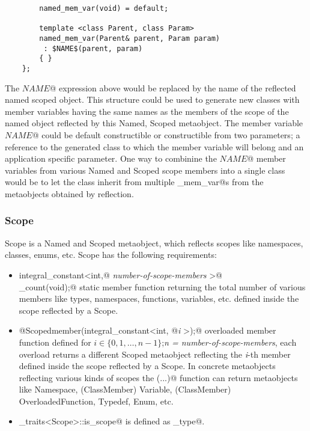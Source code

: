 \begin{itemize}
\begin{lstlisting}
		named_mem_var(void) = default;

		template <class Parent, class Param>
		named_mem_var(Parent& parent, Param param)
		 : $NAME$(parent, param)
		{ }
	};
	\end{lstlisting}
	The \verb@$NAME$@ expression above would be replaced by the name of the reflected
	named scoped object. This structure could be used to generate new classes
	with member variables having the same names as the members of the scope of the named object
	reflected by this {\metaobject Named}, {\metaobject Scoped} metaobject.
	The member variable \verb@$NAME$@ could be default constructible or constructible 
	from two parameters; a reference to the generated class to which the member variable
	will belong and an application specific parameter.
	One way to combinine the \verb@$NAME$@ member variables from various {\metaobject Named} and 
	{\metaobject Scoped} scope members into a single class would be to let the class inherit from
	multiple \verb@named_mem_var@s from the metaobjects obtained by reflection.
	
\end{itemize}

\subsubsection{Scope}

{\metaobject Scope} is a {\metaobject Named} and {\metaobject Scoped} metaobject,
which reflects scopes like namespaces, classes, enums, etc. {\metaobject Scope}
has the following requirements:

\begin{itemize}

	\item{\verb@static integral_constant<int,@ {\em number-of-scope-members}
	\verb@>@\\\verb@member_count(void);@} static member function returning the total number
	of various members like types, namespaces, functions, variables, etc. defined inside
	the scope reflected by a {\metaobject Scope}.

	\item{\verb@static @{\metaobject Scoped}\verb@ member(integral_constant<int, @{\em i}
	\verb@>);@} overloaded member function defined
	for $i \in \{0, 1, \dots, n-1\}$;{\em n = number-of-scope-members},
	each overload returns a different {\metaobject Scoped} metaobject reflecting the {\em i}-th member
	defined inside the scope reflected by a {\metaobject Scope}.
	In concrete metaobjects reflecting various kinds of scopes the \verb@member(...)@ function
	can return metaobjects like {\metaobject Namespace}, ({\metaobject ClassMember}) {\metaobject Variable},
	({\metaobject ClassMember}) {\metaobject OverloadedFunction}, {\metaobject Typedef},
	{\metaobject Enum}, etc.

	\item \verb@metaobject_traits<Scope>::is_scope@ is defined as \verb@true_type@.
\end{itemize}

